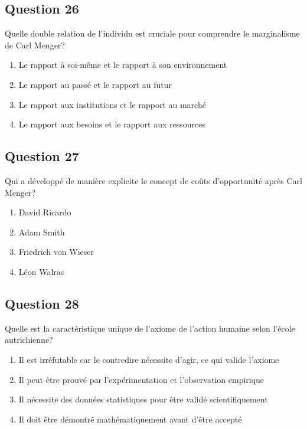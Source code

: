 \documentclass[12pt,a4paper]{article}
\begin{document}
\bigskip


\subsection*{Question 26}
Quelle double relation de l'individu est cruciale pour comprendre le marginalisme de Carl Menger?

\begin{enumerate}[label=\Alph*., leftmargin=*]
\item Le rapport à soi-même et le rapport à son environnement
\item Le rapport au passé et le rapport au futur
\item Le rapport aux institutions et le rapport au marché
\item Le rapport aux besoins et le rapport aux ressources
\end{enumerate}

\bigskip


\subsection*{Question 27}
Qui a développé de manière explicite le concept de coûts d'opportunité après Carl Menger?

\begin{enumerate}[label=\Alph*., leftmargin=*]
\item David Ricardo
\item Adam Smith
\item Friedrich von Wieser
\item Léon Walras
\end{enumerate}

\bigskip


\subsection*{Question 28}
Quelle est la caractéristique unique de l'axiome de l'action humaine selon l'école autrichienne?

\begin{enumerate}[label=\Alph*., leftmargin=*]
\item Il est irréfutable car le contredire nécessite d'agir, ce qui valide l'axiome
\item Il peut être prouvé par l'expérimentation et l'observation empirique
\item Il nécessite des données statistiques pour être validé scientifiquement
\item Il doit être démontré mathématiquement avant d'être accepté
\end{enumerate}
\end{document}
